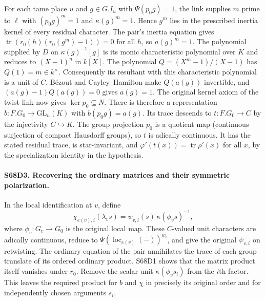 For each tame place $u$ and $g\in G.I_u$ with $\Psi(p_0g)=1$,
the link supplies $m$ prime to $\ell$ with $(p_0g)^m=1$ and
$\kappa(g)^m=1$. Hence $g^m$ lies in the prescribed inertia
kernel of every residual character. The pair's inertia equation
gives $\operatorname{tr}(r_0(h)(r_0(g^m)-1))=0$ for all $h$,
so $a(g)^m=1$. The polynomial supplied by $D$ on
$\kappa(g)^{-1}[g]$ is its monic characteristic polynomial over
$K$ and reduces to $(X-1)^n$ in $k[X]$. The polynomial
$Q=(X^m-1)/(X-1)$ has $Q(1)=m\in k^\times$. Consequently its
resultant with this characteristic polynomial is a unit of $C$.
B\'ezout and Cayley--Hamilton make $Q(a(g))$ invertible, and
$(a(g)-1)Q(a(g))=0$ gives $a(g)=1$. The original kernel axiom
of the twist link now gives $\ker p_0\subseteq N$.
There is therefore a representation $b:F.G_0\to\mathrm{GL}_n(K)$
with $b(p_0g)=a(g)$. Its trace descends to $t:F.G_0\to C$ by
the injectivity $C\hookrightarrow K$. The group projection $p_0$
is a quotient map (continuous surjection of compact Hausdorff
groups), so $t$ is adically continuous. It has the stated residual
trace, is star-invariant, and $\varphi'(t(x))=\operatorname{tr}\rho'(x)$
for all $x$, by the specialization identity in the hypothesis.

\paragraph{S68D3. Recovering the ordinary matrices and their symmetric polarization.}
In the local identification at $v$, define
\[
 \chi_{e(v),i}(\lambda_v s)=\psi_{v,i}(s)\,
                         \kappa(\phi_v s)^{-1},
\]
where $\phi_v:G_v\to G_0$ is the original local map.
These $C$-valued unit characters are adically continuous, reduce to
$\Psi(\operatorname{loc}_{e(v)}(-))^{w_i}$, and give the original
$\psi_{v,i}$ on retwisting. The ordinary equation of the pair
annihilates the trace of each group translate of its ordered
ordinary product. S68D1 shows that the matrix product itself
vanishes under $r_0$. Remove the scalar unit $\kappa(\phi_v s_i)$
from the $i$th factor. This leaves the required product for $b$
and $\chi$ in precisely its original order and for independently
chosen arguments $s_i$.

